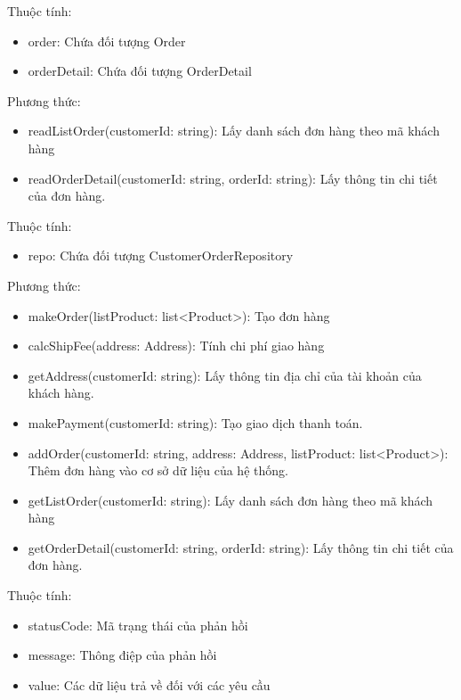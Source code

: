	Thuộc tính:
	\begin{itemize}
		\item order: Chứa đối tượng Order
		\item orderDetail: Chứa đối tượng OrderDetail
	\end{itemize}
	Phương thức:
	\begin{itemize}
		\item readListOrder(customerId: string): Lấy danh sách đơn hàng theo mã khách hàng
		\item readOrderDetail(customerId: string, orderId: string): Lấy thông tin chi tiết của đơn hàng.
	\end{itemize}

	Thuộc tính:
	\begin{itemize}
		\item repo: Chứa đối tượng CustomerOrderRepository
	\end{itemize}
	Phương thức:
	\begin{itemize}
		\item makeOrder(listProduct: list<Product>): Tạo đơn hàng
		\item calcShipFee(address: Address): Tính chi phí giao hàng
		\item getAddress(customerId: string): Lấy thông tin địa chỉ của tài khoản của khách hàng.
		\item makePayment(customerId: string): Tạo giao dịch thanh toán.
		\item addOrder(customerId: string, address: Address, listProduct: list<Product>): Thêm đơn hàng vào cơ sở dữ liệu của hệ thống.
		\item getListOrder(customerId: string): Lấy danh sách đơn hàng theo mã khách hàng
		\item getOrderDetail(customerId: string, orderId: string): Lấy thông tin chi tiết của đơn hàng.
	\end{itemize}

	Thuộc tính:
	\begin{itemize}
		\item statusCode: Mã trạng thái của phản hồi
		\item message: Thông điệp của phản hồi
		\item value: Các dữ liệu trả về đối với các yêu cầu
	\end{itemize}
	

